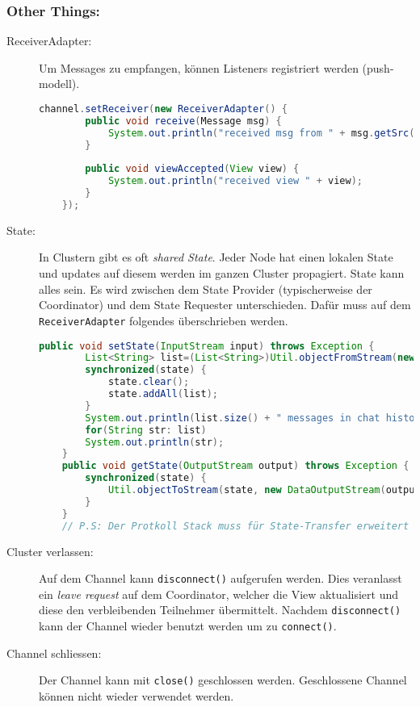 \subsubsection{Other Things:}
\begin{description}
	\item[ReceiverAdapter:] Um Messages zu empfangen, können Listeners registriert werden (push-modell).
	\begin{lstlisting}[language=Java]
	channel.setReceiver(new ReceiverAdapter() {
		public void receive(Message msg) {
			System.out.println("received msg from " + msg.getSrc() + ": " + msg.getObject());
		}
	
		public void viewAccepted(View view) {
			System.out.println("received view " + view);
		}
	});
	\end{lstlisting}
	
	\item[State:] In Clustern gibt es oft \emph{shared State}. Jeder Node hat einen lokalen State und updates auf diesem werden im ganzen Cluster propagiert. State kann alles sein. Es wird  zwischen dem State Provider (typischerweise der Coordinator) und dem State Requester unterschieden. Dafür muss auf dem \verb|ReceiverAdapter| folgendes überschrieben werden. 
	
	\begin{lstlisting}[language=Java]
	public void setState(InputStream input) throws Exception {
		List<String> list=(List<String>)Util.objectFromStream(new DataInputStream(input));
		synchronized(state) {
			state.clear();
			state.addAll(list);
		}
		System.out.println(list.size() + " messages in chat history):");
		for(String str: list)
		System.out.println(str);
	}
	public void getState(OutputStream output) throws Exception {
		synchronized(state) {
			Util.objectToStream(state, new DataOutputStream(output));
		}
	}
	// P.S: Der Protkoll Stack muss für State-Transfer erweitert werden: STATE_TRANSFER, STATE, or STATE_SOCK
	\end{lstlisting}

	\item[Cluster verlassen:] Auf dem Channel kann \verb|disconnect()| aufgerufen werden. Dies veranlasst ein \emph{leave request} auf dem Coordinator, welcher die View aktualisiert und diese den verbleibenden Teilnehmer übermittelt. Nachdem \verb|disconnect()| kann der Channel wieder benutzt werden um zu \verb|connect()|.
	
	\item[Channel schliessen:] Der Channel kann mit \verb|close()| geschlossen werden. Geschlossene Channel können nicht wieder verwendet werden.
\end{description}


